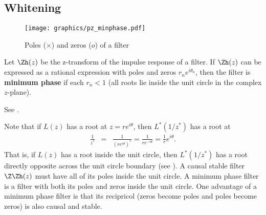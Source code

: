 \subsection{Whitening}
\label{sec:d-whiten}
\begin{figure}[h]
  \centering
  \texttt{[image: graphics/pz\_minphase.pdf]}
  \caption{
     Poles ($\times$) and zeros ($o$) of a  filter
     \label{fig:w_pz_minphase}
     }
\end{figure}
\begin{definition}
Let $\Zh(z)$ be the z-transform of the impulse response of a filter.
If $\Zh(z)$ can be expressed as a rational expression with poles and zeros
$r_ne^{i\theta_n}$,
then the filter is \textbf{minimum phase} if each $r_n<1$
(all roots lie inside the unit circle in the complex $z$-plane).
\end{definition}
See .

Note that if $L(z)$ has a root at $z=re^{i\theta}$, then
$L^\ast(1/z^\ast)$ has a root at
\begin{eqnarray*}
   \frac{1}{z^\ast}
     &=& \frac{1}{\left(re^{i\theta}\right)^\ast}
      = \frac{1}{re^{-i\theta}}
      = \frac{1}{r} e^{i\theta}.
\end{eqnarray*}
That is, if $L(z)$ has a root inside the unit circle,
then $L^\ast(1/z^\ast)$ has a root directly opposite across the unit circle
boundary (see ).
A causal stable filter $\Z\Zh(z)$ must have all of its poles inside
the unit circle.
A minimum phase filter is a filter with both its poles and zeros inside the
unit circle.
One advantage of a minimum phase filter is that its recipricol
(zeros become poles and poles become zeros)
is also causal and stable.

